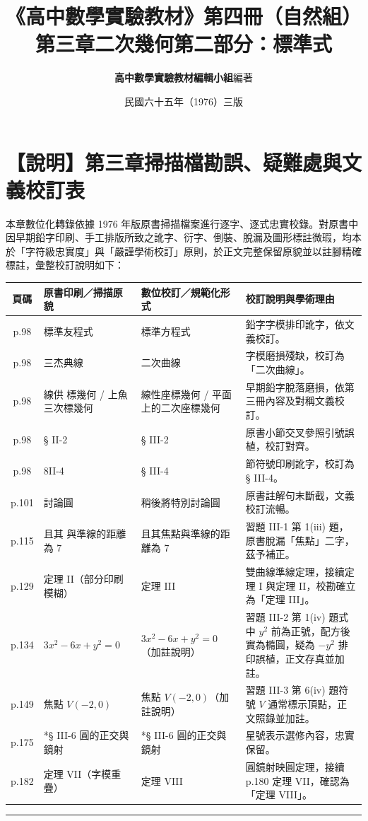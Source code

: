 \documentclass[a4paper,12pt,twoside]{article}
\title{\LARGE\textbf{《高中數學實驗教材》第四冊（自然組）}\\[0.5em] \Large\textbf{第三章\quad 二次幾何\quad 第二部分：標準式}}
\author{\textbf{高中數學實驗教材編輯小組}\quad 編著}
\date{民國六十五年（1976）三版}
\begin{document}
\maketitle
\thispagestyle{firstpage}

\section*{【說明】第三章掃描檔勘誤、疑難處與文義校訂表}

本章數位化轉錄依據 1976 年版原書掃描檔案進行逐字、逐式忠實校錄。對原書中因早期鉛字印刷、手工排版所致之訛字、衍字、倒裝、脫漏及圖形標註微瑕，均本於「字符級忠實度」與「嚴謹學術校訂」原則，於正文完整保留原貌並以註腳精確標註，彙整校訂說明如下：

\begin{table}[htbp]
\centering
\small
\begin{tabularx}{\textwidth}{|c|p{4.2cm}|p{4.5cm}|X|}
\hline
\textbf{頁碼} & \textbf{原書印刷／掃描原貌} & \textbf{數位校訂／規範化形式} & \textbf{校訂說明與學術理由} \\ \hline
p.98 & 標準友程式 & 標準方程式 & 鉛字字模排印訛字，依文義校訂。 \\ \hline
p.98 & 三杰典線 & 二次曲線 & 字模磨損殘缺，校訂為「二次曲線」。 \\ \hline
p.98 & 線供 標幾何 / 上魚三次標幾何 & 線性座標幾何 / 平面上的二次座標幾何 & 早期鉛字脫落磨損，依第三冊內容及對稱文義校訂。 \\ \hline
p.98 & § II-2 & § III-2 & 原書小節交叉參照引號誤植，校訂對齊。 \\ \hline
p.98 & 8II-4 & § III-4 & 節符號印刷訛字，校訂為 § III-4。 \\ \hline
p.101 & 討論圓 & 稍後將特別討論圓 & 原書註解句末斷截，文義校訂流暢。 \\ \hline
p.115 & 且其 與準線的距離為 7 & 且其焦點與準線的距離為 7 & 習題 III-1 第 1(iii) 題，原書脫漏「焦點」二字，茲予補正。 \\ \hline
p.129 & 定理 II（部分印刷模糊） & 定理 III & 雙曲線準線定理，接續定理 I 與定理 II，校勘確立為「定理 III」。 \\ \hline
p.134 & $3x^2 - 6x + y^2 = 0$ & $3x^2 - 6x + y^2 = 0$（加註說明） & 習題 III-2 第 1(iv) 題式中 $y^2$ 前為正號，配方後實為橢圓，疑為 $-y^2$ 排印誤植，正文存真並加註。 \\ \hline
p.149 & 焦點 $V(-2,0)$ & 焦點 $V(-2,0)$（加註說明） & 習題 III-3 第 6(iv) 題符號 $V$ 通常標示頂點，正文照錄並加註。 \\ \hline
p.175 & *§ III-6 圓的正交與鏡射 & *§ III-6 圓的正交與鏡射 & 星號表示選修內容，忠實保留。 \\ \hline
p.182 & 定理 VII（字模重疊） & 定理 VIII & 圓鏡射映圓定理，接續 p.180 定理 VII，確認為「定理 VIII」。 \\ \hline
\end{tabularx}
\end{table}

\vspace{1em}
\hrule
\vspace{1em}

\tableofcontents
\newpage


\end{document}
